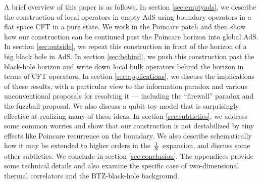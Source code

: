 A brief overview of this paper is as follows.  In section \ref{sec:emptyads}, we describe the construction of local operators in empty AdS using boundary operators in a flat space CFT in a pure state.  We work in the Poincare patch and then show how our construction can be continued past the Poincare horizon into global AdS.  In section \ref{sec:outside}, we repeat this construction in front of the horizon of a big black hole in AdS. In section \ref{sec:behind}, we push this construction past the black-hole horizon and write down local bulk operators behind the horizon in terms of CFT operators.  In section \ref{sec:applications}, we discuss the implications of these results, with a particular view to the information paradox and various unconventional proposals for resolving it --- including the ``firewall'' paradox and the fuzzball proposal. We also discuss a qubit toy model that is surprisingly effective at realizing many of these ideas. In section \ref{sec:subtleties}, we address some common worries 
and 
show that our construction is not destabilized by tiny effects like 
Poincare recurrence on the boundary. We also describe schematically how it may be extended to higher orders in the ${1 \over N}$ expansion, and discuss some other subtleties. We conclude in section \ref{sec:conclusion}. The appendices provide some technical details and also examine the specific case of two-dimensional thermal correlators and the BTZ-black-hole background.



